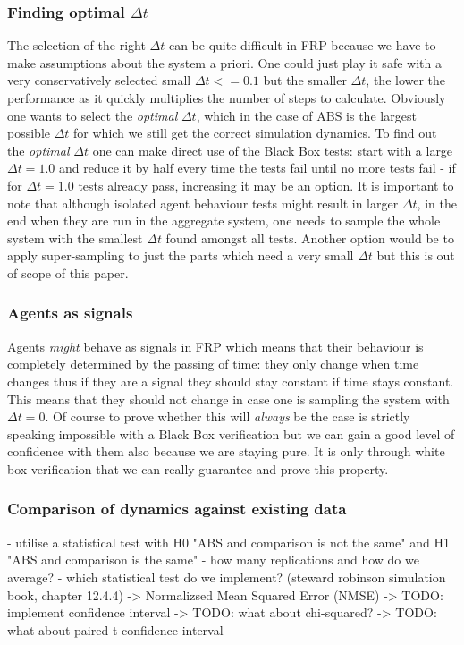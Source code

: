 \subsubsection{Finding optimal $\Delta t$}
The selection of the right $\Delta t$ can be quite difficult in FRP because we have to make assumptions about the system a priori. One could just play it safe with a very conservatively selected small $\Delta t <= 0.1$ but the smaller $\Delta t$, the lower the performance as it quickly multiplies the number of steps to calculate. Obviously one wants to select the \textit{optimal} $\Delta t$, which in the case of ABS is the largest possible $\Delta t$ for which we still get the correct simulation dynamics.
To find out the \textit{optimal} $\Delta t$ one can make direct use of the Black Box tests: start with a large $\Delta t = 1.0$ and reduce it by half every time the tests fail until no more tests fail - if for $\Delta t = 1.0$ tests already pass, increasing it may be an option. It is important to note that although isolated agent behaviour tests might result in larger $\Delta t$, in the end when they are run in the aggregate system, one needs to sample the whole system with the smallest $\Delta t$ found amongst all tests. Another option would be to apply super-sampling to just the parts which need a very small $\Delta t$ but this is out of scope of this paper.

\subsubsection{Agents as signals}
Agents \textit{might} behave as signals in FRP which means that their behaviour is completely determined by the passing of time: they only change when time changes thus if they are a signal they should stay constant if time stays constant. This means that they should not change in case one is sampling the system with $\Delta t = 0$. Of course to prove whether this will \textit{always} be the case is strictly speaking impossible with a Black Box verification but we can gain a good level of confidence with them also because we are staying pure. It is only through white box verification that we can really guarantee and prove this property.

\subsubsection{Comparison of dynamics against existing data}
- utilise a statistical test with H0 "ABS and comparison is not the same" and H1 "ABS and comparison is the same"
- how many replications and how do we average?
- which statistical test do we implement? (steward robinson simulation book, chapter 12.4.4)
	-> Normalizsed Mean Squared Error (NMSE)
	-> TODO: implement confidence interval 
	-> TODO: what about chi-squared?
	-> TODO: what about paired-t confidence interval


